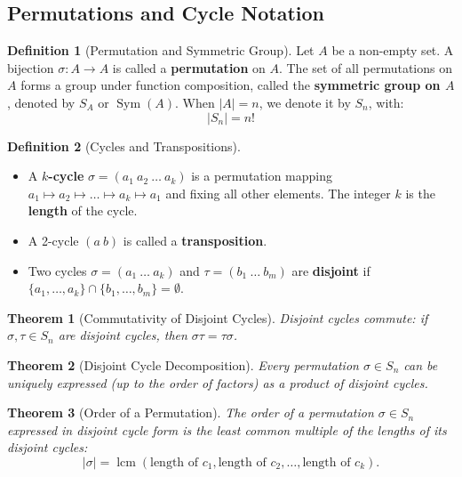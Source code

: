 \documentclass[12pt]{article}
\theoremstyle{definition}
\newtheorem{definition}{Definition}[section]
\theoremstyle{plain}
\newtheorem{theorem}{Theorem}[section]
\begin{document}
\subsection{Permutations and Cycle Notation}

\begin{definition}[Permutation and Symmetric Group]
Let $A$ be a non-empty set. A bijection $\sigma: A \to A$ is called a \textbf{permutation} on $A$.
The set of all permutations on $A$ forms a group under function composition, called the \textbf{symmetric group on $A$}, denoted by $S_A$ or $\operatorname{Sym}(A)$.
When $|A| = n$, we denote it by $S_n$, with:
\[
|S_n| = n!
\]
\end{definition}

\begin{definition}[Cycles and Transpositions]
\begin{itemize}
    \item A \textbf{$k$-cycle} $\sigma = (a_1\ a_2\ \dots\ a_k)$ is a permutation mapping $a_1 \mapsto a_2 \mapsto \dots \mapsto a_k \mapsto a_1$ and fixing all other elements. The integer $k$ is the \textbf{length} of the cycle.
    \item A 2-cycle $(a\ b)$ is called a \textbf{transposition}.
    \item Two cycles $\sigma = (a_1\ \dots\ a_k)$ and $\tau = (b_1\ \dots\ b_m)$ are \textbf{disjoint} if $\{a_1, \dots, a_k\} \cap \{b_1, \dots, b_m\} = \emptyset$.
\end{itemize}
\end{definition}

\begin{theorem}[Commutativity of Disjoint Cycles]
Disjoint cycles commute: if $\sigma, \tau \in S_n$ are disjoint cycles, then $\sigma \tau = \tau \sigma$.
\end{theorem}

\begin{theorem}[Disjoint Cycle Decomposition]
Every permutation $\sigma \in S_n$ can be uniquely expressed (up to the order of factors) as a product of disjoint cycles.
\end{theorem}

\begin{theorem}[Order of a Permutation]
The order of a permutation $\sigma \in S_n$ expressed in disjoint cycle form is the least common multiple of the lengths of its disjoint cycles:
\[
|\sigma| = \operatorname{lcm}(\text{length of } c_1, \text{length of } c_2, \dots, \text{length of } c_k).
\]
\end{theorem}
\end{document}

